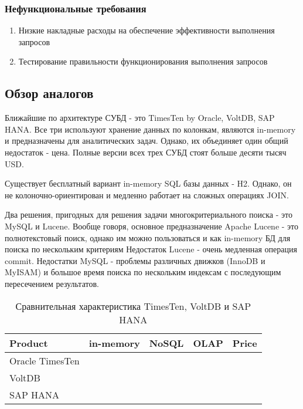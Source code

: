 \documentclass{matmex-diploma}
\begin{document}
        \subsubsection{Нефункциональные требования}
            \begin{enumerate}\itemsep1pt \parskip0pt  
                    \item Низкие накладные расходы на обеспечение эффективности выполнения запросов
                    \item Тестирование правильности функционирования выполнения запросов
            \end{enumerate}
    \subsection{Обзор аналогов}
        Ближайшие по архитектуре СУБД - это TimesTen by Oracle, VoltDB, SAP HANA. Все три используют хранение данных по колонкам, являются in-memory и предназначены для аналитических задач. Однако, их объединяет один общий недостаток - цена. Полные версии всех трех СУБД стоят больше десяти тысяч USD.
    
    Существует бесплатный вариант in-memory SQL базы данных - H2. Однако, он не колоночно-ориентирован и медленно работает на сложных операциях JOIN.
    
    Два решения, пригодных для решения задачи многокритериального поиска - это MySQL и Lucene. Вообще говоря, основное предназначение Apache Lucene - это полнотекстовый поиск, однако им можно пользоваться и как in-memory БД для поиска по нескольким критериям  Недостаток Lucene - очень медленная операция commit. Недостатки MySQL - проблемы различных движков (InnoDB и MyISAM) и большое время поиска по нескольким индексам с последующим пересечением результатов. 
    
    \begin{table}[h]
        \centering
        \begin{tabular}{| l | c | c | c | c |}
            \hline
            Product & in-memory & NoSQL & OLAP & Price \\
            \hline
            Oracle TimesTen & \color{green}{\checkmark} & \color{green}{\checkmark} & \color{green}{\checkmark} & \color{red}{€19,969.00} \\
            \hline 
            VoltDB          & \color{green}{\checkmark} & \color{green}{\checkmark} & \color{green}{\checkmark} & \color{red}{\$3500/month} \\
            \hline
            SAP HANA        & \color{green}{\checkmark} & \color{green}{\checkmark} & \color{green}{\checkmark} & \color{red}{\$3595/month}\\
            \hline
        \end{tabular}
        \caption{Сравнительная характеристика TimesTen, VoltDB и SAP HANA}
    \end{table}
    
\end{document}
